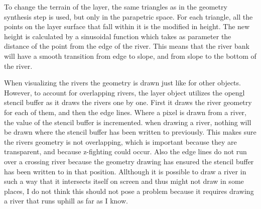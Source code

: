\documentclass[a4paper,12pt]{report}
\begin{document}
To change the terrain of the layer, the same triangles as in the geometry synthesis step is used, but only in the parapetric space. For each triangle, all the points on the layer surface that fall within it is the modified in height. The new height is calculated by a sinusoidal function which takes as parameter the distance of the point from the edge of the river. This means that the river bank will have a smooth transition from edge to slope, and from slope to the bottom of the river.

When visualizing the rivers the geometry is drawn just like for other objects. However, to account for overlapping rivers, the layer object utilizes the opengl stencil buffer as it draws the rivers one by one. First it draws the river geometry for each of them, and then the edge lines. Where a pixel is drawn from a river, the value of the stencil buffer is incremented. when drawing a river, nothing will be drawn where the stencil buffer has been written to previously. This makes sure the rivers geometry is not overlapping, which is important because they are transparent, and because z-fighting could occur. Also the edge lines do not run over a crossing river because the geometry drawing has ensured the stencil buffer has been written to in that position. Allthough it is possible to draw a river in such a way that it intersects itself on screen and thus might not draw in some places, I do not think this should not pose a problem because it requires drawing a river that runs uphill as far as I know.
\end{document}
